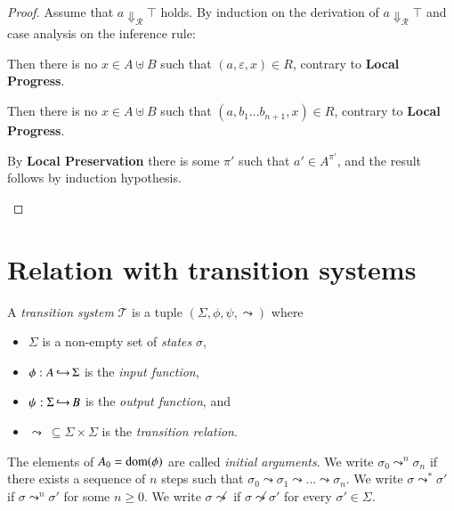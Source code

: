 \documentclass[a4paper,final,preprint,sort&compress]{elsarticle}
\newcommand{\R}{\ensuremath{\mathcal{R}}}
\newcommand{\T}{\ensuremath{\mathcal{T}}}
\begin{document}
\begin{proof}
  Assume that $a \Downarrow_\R \top$ holds. By induction on the derivation of $a \Downarrow_\R \top$ and
  case analysis on the inference rule:
  \begin{description}[font=\sc,labelindent=\parindent,style=nextline]
  \item[(Err-1)]

    Then there is no \mbox{$x \in A \uplus B$} such that \mbox{$(a,\varepsilon,x) \in R$},
    contrary to \textbf{Local Progress}.

  \item[(Err-2)]

    Then there is no \mbox{$x \in A \uplus B$} such that \mbox{$(a,b_1 \ldots b_{n+1},x) \in R$},
    contrary to \textbf{Local Progress}.

  \item[(Err-3)]

    By \textbf{Local Preservation} there is some $\pi'$ such that $a' \in A^{\pi'}$, and the result
    follows by induction hypothesis.
    
  \end{description}
\end{proof}


\section{Relation with transition systems}
\label{sec:Relation_with_transition_systems}


A \emph{transition system} $\T$ is a tuple $(\Sigma, \phi, \psi, \leadsto)$ where
\begin{itemize}
\item $\Sigma$ is a non-empty set of \emph{states} $\sigma$,
\item $\phi: A \operatorname{\hookrightarrow} \Sigma$ is the \emph{input function},
\item $\psi: \Sigma \operatorname{\hookrightarrow} B$ is the \emph{output function}, and
\item $\leadsto~\subseteq \Sigma \times \Sigma$ is the \emph{transition relation}.
\end{itemize}
The elements of $A_0 = \operatorname{dom}(\phi)$ are called \emph{initial arguments}.
We write \mbox{$\sigma_0 \leadsto^n \sigma_n$} if there exists a sequence of $n$ steps
such that \mbox{$\sigma_0 \leadsto \sigma_1 \leadsto \ldots \leadsto \sigma_n$}. We
write \mbox{$\sigma \leadsto^* \sigma'$} if \mbox{$\sigma \leadsto^n \sigma'$} for some
\mbox{$n \ge 0$}. We write \mbox{$\sigma \not\leadsto$} if \mbox{$\sigma \not\leadsto \sigma'$}
for every \mbox{$\sigma' \in \Sigma$}.
\end{document}
